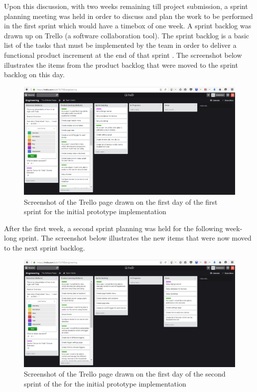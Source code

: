 \documentclass[10pt,twocolumn]{witseiepaper}
\begin{document}
	Upon this discussion, with two weeks remaining till project submission, a sprint planning meeting was held in order to discuss and plan the work to be performed in the first sprint which would have a timebox of one week. A sprint backlog was drawn up on Trello (a software collaboration tool). The sprint backlog is a basic list of the tasks that must be implemented by the team in order to deliver a functional product increment at the end of that sprint \cite{sprintbacklogdef}. 
	\newline
	\newline
	The screenshot below illustrates the items from the product backlog that were moved to the sprint backlog on this day. 
	\begin{figure}[H]
		\centering
		\includegraphics[width=\linewidth]{sprint_backlog_1}
		\caption{Screenshot of the Trello page drawn on the first day of the first sprint for the initial prototype implementation}
		\label{fig:sprint_backlog_1}
	\end{figure}
	\newpage
	After the first week, a second sprint planning was held for the following week-long sprint. The screenshot below illustrates the new items that were now moved to the next sprint backlog. 
	
	\begin{figure}[H]
		\centering
		\includegraphics[width=\linewidth]{sprint_backlog_2}
		\caption{Screenshot of the Trello page drawn on the first day of the second sprint of the for the initial prototype implementation}
		\label{fig:sprint_backlog_2}
	\end{figure}
	
\end{document}

